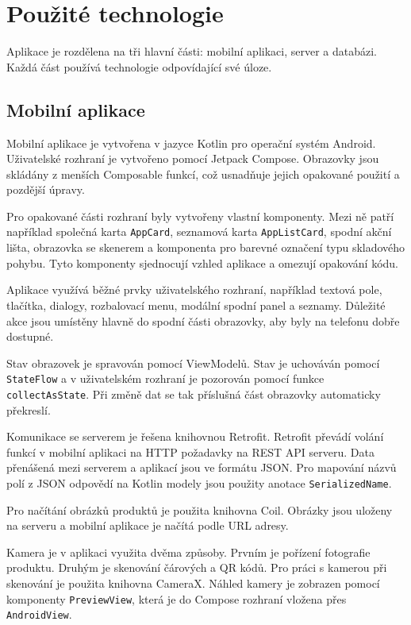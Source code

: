 \documentclass[czech, oth, kiv, he, pdf, viewonly]{fasthesis}
\begin{document}
\section{Použité technologie}

Aplikace je rozdělena na tři hlavní části: mobilní aplikaci, server
a databázi. Každá část používá technologie odpovídající své úloze.

\subsection{Mobilní aplikace}

Mobilní aplikace je vytvořena v jazyce Kotlin pro operační systém
Android. Uživatelské rozhraní je vytvořeno pomocí Jetpack Compose.
Obrazovky jsou skládány z menších Composable funkcí, což usnadňuje
jejich opakované použití a pozdější úpravy.

Pro opakované části rozhraní byly vytvořeny vlastní komponenty.
Mezi ně patří například společná karta \texttt{AppCard}, seznamová
karta \texttt{AppListCard}, spodní akční lišta, obrazovka se skenerem
a komponenta pro barevné označení typu skladového pohybu. Tyto
komponenty sjednocují vzhled aplikace a omezují opakování kódu.

Aplikace využívá běžné prvky uživatelského rozhraní, například textová
pole, tlačítka, dialogy, rozbalovací menu, modální spodní panel a
seznamy. Důležité akce jsou umístěny hlavně do spodní části obrazovky,
aby byly na telefonu dobře dostupné.

Stav obrazovek je spravován pomocí ViewModelů. Stav je uchováván
pomocí \texttt{StateFlow} a v uživatelském rozhraní je pozorován pomocí
funkce \texttt{collectAsState}. Při změně dat se tak příslušná část
obrazovky automaticky překreslí.

Komunikace se serverem je řešena knihovnou Retrofit. Retrofit převádí
volání funkcí v mobilní aplikaci na HTTP požadavky na REST API serveru.
Data přenášená mezi serverem a aplikací jsou ve formátu JSON. Pro
mapování názvů polí z JSON odpovědí na Kotlin modely jsou použity
anotace \texttt{SerializedName}.

Pro načítání obrázků produktů je použita knihovna Coil. Obrázky jsou
uloženy na serveru a mobilní aplikace je načítá podle URL adresy.

Kamera je v aplikaci využita dvěma způsoby. Prvním je pořízení
fotografie produktu. Druhým je skenování čárových a QR kódů. Pro práci
s kamerou při skenování je použita knihovna CameraX. Náhled kamery je
zobrazen pomocí komponenty \texttt{PreviewView}, která je do Compose
rozhraní vložena přes \texttt{AndroidView}.
\end{document}

